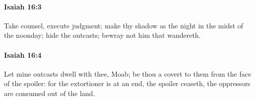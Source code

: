 		\paragraph{Isaiah 16:3} %
			\label{ISAIAH-16-3}

			Take counsel, execute judgment; make thy shadow as the night in the midst of the noonday; hide the outcasts; bewray not him that wandereth.


		\paragraph{Isaiah 16:4} %
			\label{ISAIAH-16-4}

			Let mine outcasts dwell with thee, Moab; be thou a covert to them from the face of the spoiler: for the extortioner is at an end, the spoiler ceaseth, the oppressors are consumed out of the land.


